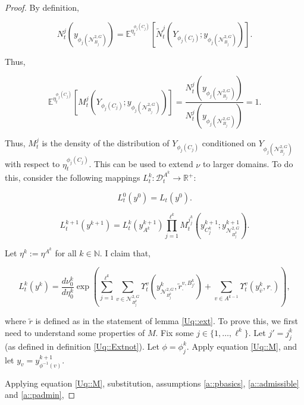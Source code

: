 \documentclass[12pt]{article}
\newcommand{\mb}{\mathbb}
\newcommand{\mc}{\mathcal}
\newcommand{\ra}{\rightarrow}
\newcommand{\ov}{\overline}
\newcommand{\exmu}[2]{\mb{E}^{#1}\left[#2\right]}	%
\newcommand{\defeq}{:=}								%
\newcommand{\cad}{\mc{D}}							%
\newcommand{\dgneigh}[2]{\mc{N}^{2,#1}_{#2}}		%
\newcommand{\cl}[1]{\ov{#1}}						%
\newcommand{\indx}[1]{^{#1}}						%
\newcommand{\rate}{r}								%
\newcommand{\xg}{y}									%
\newcommand{\vind}[1]{_{#1}}						%
\newcommand{\vpara}[1]{^{#1}}						%
\newcommand{\stpara}[1]{_{#1}}						%
\newcommand{\tpara}[1]{_{#1}}						%
\newcommand{\psize}{\ell}							%
\newcommand{\Xg}{Y}									%
\newcommand{\brate}{\alt{\rate}}					%
\newcommand{\alt}[1]{\tilde{#1}}					%
\newcommand{\mm}{\nu}								%
\newcommand{\mmm}{\eta}								%
\newcommand{\ds}{\Upsilon}							%
\newcommand{\dense}{L}								%
\newcommand{\densen}{N}								%
\newcommand{\denseph}{\alt{N}}						%
\newcommand{\mdense}{M}								%
\newcommand{\jpara}[1]{^{#1}}						%
\newcommand{\vjpara}[2]{^{#1,#2}}					%
\begin{document}
\begin{proof}
By definition, 

\[\densen\jpara{j}\tpara{t}(\xg\vind{\phi_j(\dgneigh{G}{B_j})}) = \exmu{\mmm\vpara{\phi_j(C_j)}\tpara{t}}{\denseph\jpara{j}\tpara{t}(\Xg\vind{\phi_j(C_j)};\xg\vind{\phi_j(\dgneigh{G}{B_j})})}.\]

Thus,

\[\exmu{\mmm\vpara{\phi_j(C_j)}\tpara{t}}{\mdense\jpara{j}\tpara{t}(\Xg\vind{\phi_j(C_j)};\xg\vind{\phi_j(\dgneigh{G}{B_j})})} = \frac{\densen\jpara{j}\tpara{t}(\xg\vind{\phi_j(\dgneigh{G}{B_j})})}{\densen\jpara{j}\tpara{t}(\xg\vind{\phi_j(\dgneigh{G}{B_j})})} = 1.\]

Thus, \(\mdense\jpara{j}\tpara{t}\) is the density of the distribution of \(\Xg\vind{\phi_j(C_j)}\) conditioned on \(\Xg\vind{\phi_j(\dgneigh{G}{B_j})}\) with respect to \(\mmm\vpara{\phi_j(C_j)}\tpara{t}\). This can be used to extend \(\mm\) to larger domains. To do this, consider the following mappings \(\dense\indx{k}\tpara{t}: \cad\vpara{A\indx{k}}\tpara{t} \ra \mb{R}^+\):

\[\dense\indx{0}\tpara{t}(\xg\indx{0}) = \dense\tpara{t}(\xg\indx{0}).\]

\[\dense\indx{k+1}\tpara{t}(\xg\indx{k+1}) = \dense\indx{k}\tpara{t}(\xg\indx{k+1}\vind{A\indx{k}})\prod_{j=1}^{\psize\indx{k}}\mdense\jpara{j\indx{k}_j}\tpara{t}\left(\xg\indx{k+1}\vind{C_j\indx{k}};\xg\indx{k+1}\vind{\dgneigh{G}{B\indx{k}_j}}\right).\]

Let \(\mmm\indx{k} \defeq \mmm\vpara{A\indx{k}}\) for all \(k\in \mb{N}\). I claim that,

\[\dense\indx{k}\tpara{t}(\xg\indx{k}) = \frac{d\mm\indx{k}\tpara{0}}{d\mmm\indx{k}\tpara{0}}\exp\left(\sum_{j=1}^{\psize\indx{k}}\sum_{v\in \dgneigh{G}{B_j\indx{k}}} \ds\vpara{v}\tpara{t}\left(\xg\indx{k}\vind{\dgneigh{G}{B_j\indx{k}}},\brate\vjpara{v}{B\indx{k}_{j'}}\stpara{\cdot}\right) + \sum_{v \in A\indx{k-1}} \ds\vpara{v}\tpara{t}\left(\xg\indx{k}\vind{\cl{v}},\rate\stpara{\cdot}\right)\right),\]

where \(\brate\) is defined as in the statement of lemma \ref{Uq::ext}. To prove this, we first need to understand some properties of \(\mdense\). Fix some \(j \in \{1,\dots,\psize\indx{k}\}\). Let \(j' = j\indx{k}_j\) (as defined in definition \ref{Uq::Extnot}). Let \(\phi = \phi\indx{k}_j\). Apply equation \eqref{Uq::M}, and let \(\xg\vind{v} = \xg\indx{k+1}\vind{\phi^{-1}(v)}\).



Applying equation \eqref{Uq::M}, substitution, assumptions \ref{a::pbasics}, \ref{a::admissible} and \ref{a::padmin},


\end{proof}
\end{document}
